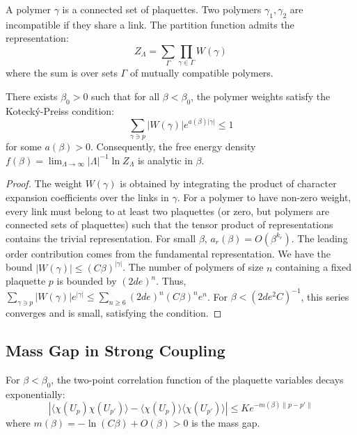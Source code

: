 \begin{definition}
A polymer $\gamma$ is a connected set of plaquettes. Two polymers $\gamma_1, \gamma_2$ are incompatible if they share a link. The partition function admits the representation:
\begin{equation}
Z_\Lambda = \sum_{\Gamma} \prod_{\gamma \in \Gamma} W(\gamma)
\end{equation}
where the sum is over sets $\Gamma$ of mutually compatible polymers.
\end{definition}

\begin{theorem}
\label{thm:cluster_convergence}
There exists $\beta_0 > 0$ such that for all $\beta < \beta_0$, the polymer weights satisfy the Koteck\'y-Preiss condition:
\begin{equation}
\sum_{\gamma \ni p} |W(\gamma)| e^{a(\beta) |\gamma|} \le 1
\end{equation}
for some $a(\beta) > 0$. Consequently, the free energy density $f(\beta) = \lim_{\Lambda \to \infty} |\Lambda|^{-1} \ln Z_\Lambda$ is analytic in $\beta$.
\end{theorem}

\begin{proof}
The weight $W(\gamma)$ is obtained by integrating the product of character expansion coefficients over the links in $\gamma$. For a polymer to have non-zero weight, every link must belong to at least two plaquettes (or zero, but polymers are connected sets of plaquettes) such that the tensor product of representations contains the trivial representation.
For small $\beta$, $a_r(\beta) = O(\beta^{k_r})$. The leading order contribution comes from the fundamental representation.
We have the bound $|W(\gamma)| \le (C \beta)^{|\gamma|}$.
The number of polymers of size $n$ containing a fixed plaquette $p$ is bounded by $(2d e)^n$.
Thus, $\sum_{\gamma \ni p} |W(\gamma)| e^{|\gamma|} \le \sum_{n \ge 6} (2d e)^n (C \beta)^n e^n$.
For $\beta < (2de^2 C)^{-1}$, this series converges and is small, satisfying the condition.
\end{proof}

\subsection{Mass Gap in Strong Coupling}
\begin{theorem}
For $\beta < \beta_0$, the two-point correlation function of the plaquette variables decays exponentially:
\begin{equation}
|\langle \chi(U_p) \chi(U_{p'}) \rangle - \langle \chi(U_p) \rangle \langle \chi(U_{p'}) \rangle| \le K e^{-m(\beta) \|p - p'\|}
\end{equation}
where $m(\beta) = - \ln(C \beta) + O(\beta) > 0$ is the mass gap.
\end{theorem}

